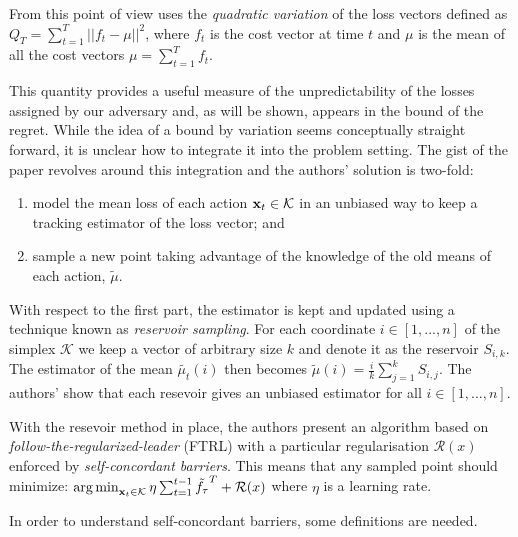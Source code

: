 From this point of view \citep{hazan} uses the \textit{quadratic variation} of the loss vectors defined as $Q_T = \sum_{t=1}^T || f_t - \mu ||^2$, where $f_t$ is the cost vector at time $t$ and $\mu$ is the mean of all the cost vectors $\mu = \sum_{t=1}^T f_t$. 

This quantity provides a useful measure of the unpredictability of the losses assigned by our adversary and, as will be shown, appears in the bound of the regret. While the idea of a bound by variation seems conceptually straight forward, it is unclear how to integrate it into the problem setting. The gist of the paper revolves around this integration and the authors' solution is two-fold:

\begin{enumerate}
	\item model the mean loss of each action ${\bf x}_t \in \mathcal{K}$ in an unbiased way to keep a tracking estimator of the loss vector; and 
	\item sample a new point taking advantage of the knowledge of the old means of each action, $\tilde{\mu}$.
\end{enumerate}

With respect to the first part, the estimator is kept and updated using a technique known as \textit{reservoir sampling}. For each coordinate $i\in[1,...,n]$ of the simplex $\mathcal{K}$ we keep a vector of arbitrary size $k$ and denote it as the reservoir $S_{i, k}$. The estimator of the mean $\tilde{\mu_t}(i)$  then becomes $\tilde{\mu}(i) = \frac{i}{k} \sum_{j=1}^kS_{i, j}$. The authors' show that each resevoir gives an unbiased estimator for all $i\in[1,...,n]$.

With the resevoir method in place, the authors present an algorithm based on \textit{follow-the-regularized-leader} (FTRL) with a particular regularisation $\mathcal{R}(x)$ enforced by \textit{self-concordant barriers}. This means that any sampled point should
minimize: $\operatorname*{arg\,min}_{{\bf x}_t\in\mathcal{K}}\eta \sum_{t=1}^{t-1} \tilde{f_{\tau}}^T + \mathcal{R}(x)$ where $\eta$ is a learning rate. 

In order to understand self-concordant barriers, some definitions are needed.

